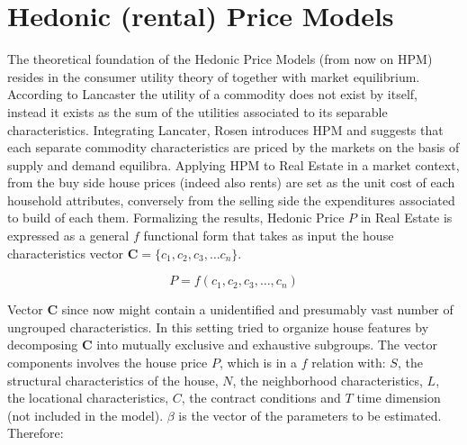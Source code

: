 \documentclass[
  12pt,
  a4paper,
  oneside]{book}
\theoremstyle{definition}
\theoremstyle{definition}
\theoremstyle{definition}
\theoremstyle{remark}
\begin{document}
\hypertarget{hedonic-rental-price-models}{%
\section{Hedonic (rental) Price Models}\label{hedonic-rental-price-models}}

The theoretical foundation of the Hedonic Price Models (from now on HPM) resides in the consumer utility theory of \citet{Lancaster} together with \citet{Rosen} market equilibrium. According to Lancaster the utility of a commodity does not exist by itself, instead it exists as the sum of the utilities associated to its separable characteristics. Integrating Lancater, Rosen introduces HPM and suggests that each separate commodity characteristics are priced by the markets on the basis of supply and demand equilibra. Applying HPM to Real Estate in a market context, from the buy side house prices (indeed also rents) are set as the unit cost of each household attributes, conversely from the selling side the expenditures associated to build of each them.
Formalizing the results, Hedonic Price \(P\) in Real Estate is expressed as a general \(f\) functional form that takes as input the house characteristics vector \(\mathbf{C} = \{c_1,c_2, c_3, \ldots c_n\}\).

\[P=f\left(c_{1}, c_{2}, c_{3}, \ldots, c_{n}\right)\]

Vector \(\mathbf{C}\) since now might contain a unidentified and presumably vast number of ungrouped characteristics. In this setting \citet{Malpezzi} tried to organize house features by decomposing \(\mathbf{C}\) into mutually exclusive and exhaustive subgroups. The vector components involves the house price \(P\), which is in a \(f\) relation with: \(S\), the structural characteristics of the house, \(N\), the neighborhood characteristics, \(L\), the locational characteristics, \(C\), the contract conditions and \(T\) time dimension (not included in the model). \(\beta\) is the vector of the parameters to be estimated. Therefore:
\end{document}
